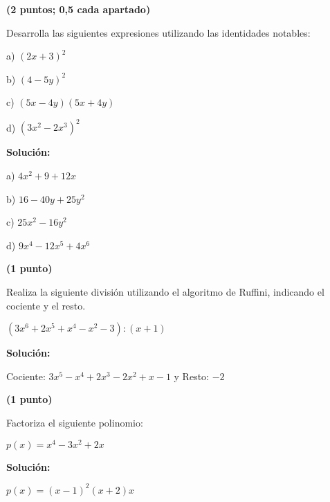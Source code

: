 \documentclass[palatino,noprobframes]{CuartillaSafa}
\renewcommand{\solution}[1]{\textbf{Solución:}
#1
}
\begin{document}
\begin{problem}\textbf{(2 puntos; 0,5 cada apartado)}

Desarrolla las siguientes expresiones utilizando las identidades notables:

a) $(2x+3)^2 $

b) $(4-5y)^2$

c) $(5x-4y)(5x+4y)$

d) $\left(3x^2-2x^3\right)^2$

\solution{
	
a) $4x^2+9+12x$

b) $16-40y+25y^2$

c) $25x^2-16y^2$

d) $9x^4 - 12x^5 + 4x^6$

}
\end{problem}


\begin{problem}\textbf{(1 punto)}

	Realiza la siguiente división utilizando el algoritmo de Ruffini, indicando el cociente y el resto.

	$(3x^6+2x^5+x^4-x^2-3) : (x+1)$

	\solution{

	Cociente: $3x^5-x^4+2x^3-2x^2+x-1$ y Resto: $-2$

}
\end{problem}

\begin{problem}\textbf{(1 punto)}

	Factoriza el siguiente polinomio:

	$p(x) = x^4-3x^2+2x$

	\solution{

	$p(x) = (x-1)^2(x+2)x$


}
\end{problem}

\end{document}
